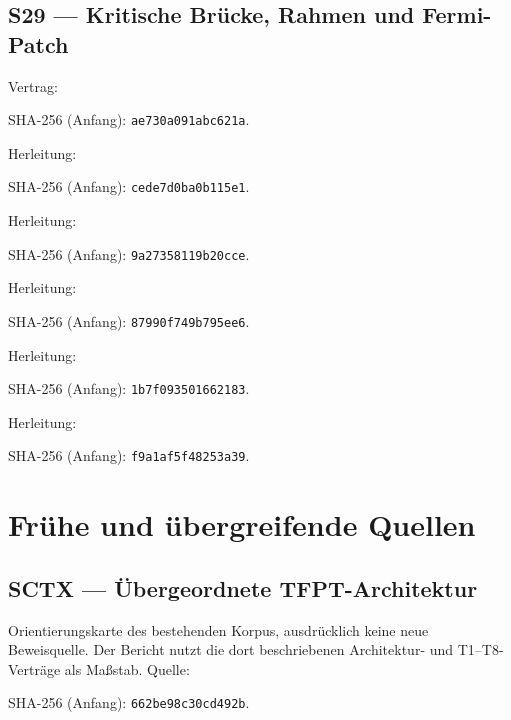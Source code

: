 \documentclass[11pt,a4paper,oneside,parskip=half,headings=normal,numbers=noenddot,bibliography=totoc]{scrreprt}
\begin{document}
\subsection*{S29 — Kritische Brücke, Rahmen und Fermi-Patch}\label{s:29}
{\small{}\par}
Vertrag: \par{\footnotesize SHA-256 (Anfang): \texttt{ae730a091abc621a}.}\par
Herleitung: \par{\footnotesize SHA-256 (Anfang): \texttt{cede7d0ba0b115e1}.}\par
Herleitung: \par{\footnotesize SHA-256 (Anfang): \texttt{9a27358119b20cce}.}\par
Herleitung: \par{\footnotesize SHA-256 (Anfang): \texttt{87990f749b795ee6}.}\par
Herleitung: \par{\footnotesize SHA-256 (Anfang): \texttt{1b7f093501662183}.}\par
Herleitung: \par{\footnotesize SHA-256 (Anfang): \texttt{f9a1af5f48253a39}.}\par
\section{Frühe und übergreifende Quellen}
\subsection*{SCTX — Übergeordnete TFPT-Architektur}\label{s:CTX}
Orientierungskarte des bestehenden Korpus, ausdrücklich keine neue Beweisquelle. Der Bericht nutzt die dort beschriebenen Architektur- und T1--T8-Verträge als Maßstab.
Quelle: \par{\footnotesize SHA-256 (Anfang): \texttt{662be98c30cd492b}.}\par
\end{document}
